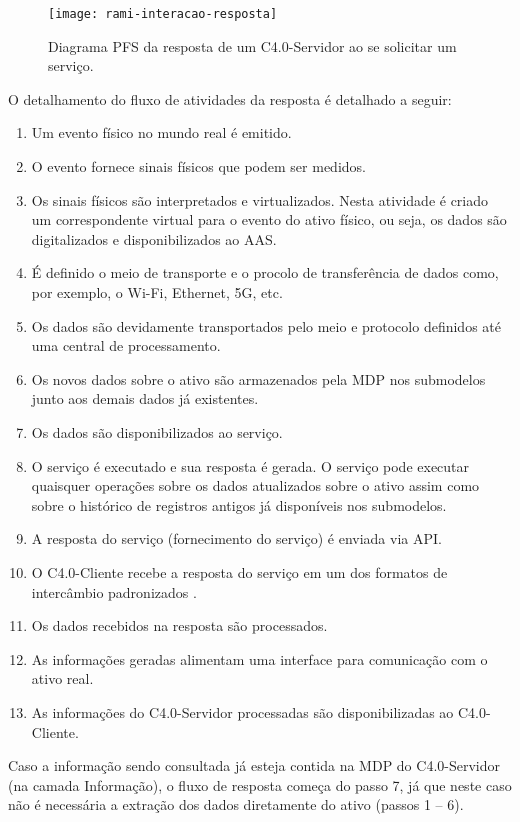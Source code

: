 \begin{figure}[th]
	\centering
	\texttt{[image: rami-interacao-resposta]}
	\caption{Diagrama PFS da resposta de um C4.0-Servidor ao se solicitar um serviço.}
	\label{fig:rami-interacao-resposta}
\end{figure}

O detalhamento do fluxo de atividades da resposta é detalhado a seguir:

\begin{enumerate}

	\item Um evento físico no mundo real é emitido.

	\item O evento fornece sinais físicos que podem ser medidos.

	\item Os sinais físicos são interpretados e virtualizados. Nesta atividade é criado um correspondente virtual para o evento do ativo físico, ou seja, os dados são digitalizados e disponibilizados ao AAS.

	\item É definido o meio de transporte e o procolo de transferência de dados como, por exemplo, o Wi-Fi, Ethernet, 5G, etc.

	\item Os dados são devidamente transportados pelo meio e protocolo definidos até uma central de processamento.

	\item Os novos dados sobre o ativo são armazenados pela MDP nos submodelos junto aos demais dados já existentes.

	\item Os dados são disponibilizados ao serviço.

	\item O serviço é executado e sua resposta é gerada. O serviço pode executar quaisquer operações sobre os dados atualizados sobre o ativo assim como sobre o histórico de registros antigos já disponíveis nos submodelos.

	\item A resposta do serviço (fornecimento do serviço) é enviada via API.

	\item O C4.0-Cliente recebe a resposta do serviço em um dos formatos de intercâmbio padronizados \cite{bader2019aas}.

	\item Os dados recebidos na resposta são processados.

	\item As informações geradas alimentam uma interface para comunicação com o ativo real.

	\item As informações do C4.0-Servidor processadas são disponibilizadas ao C4.0-Cliente.
\end{enumerate}

Caso a informação sendo consultada já esteja contida na MDP do C4.0-Servidor (na camada Informação), o fluxo de resposta começa do passo 7, já que neste caso não é necessária a extração dos dados diretamente do ativo (passos 1 -- 6).
